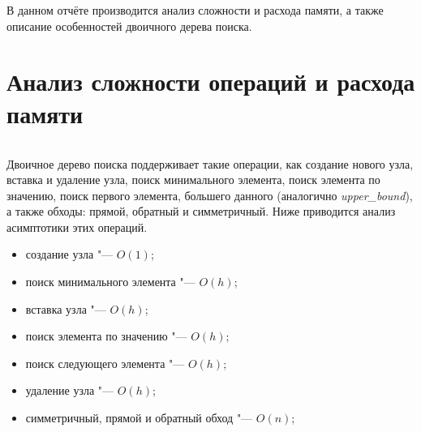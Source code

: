 \documentclass[otchet]{../SCWorks}
\begin{document}

\date{2026}

\maketitle

\secNumbering

\tableofcontents




\intro
В данном отчёте производится анализ сложности и расхода памяти, а также описание особенностей двоичного дерева поиска.

\section{Анализ сложности операций и расхода памяти}

\small
\inputminted[breaklines]{cpp}{./binary_tree.cpp}
\normalsize

Двоичное дерево поиска поддерживает такие операции, как создание нового узла, вставка и удаление узла, поиск минимального элемента, поиск элемента по значению, поиск первого элемента, большего данного (аналогично \textit{upper\_bound}), а также обходы: прямой, обратный и симметричный. Ниже приводится анализ асимптотики этих операций.

\begin{itemize}
	\item создание узла "--- $O(1)$;
	\item поиск минимального элемента "--- $O(h)$;
	\item вставка узла "--- $O(h)$;
	\item поиск элемента по значению "--- $O(h)$;
	\item поиск следующего элемента "--- $O(h)$;
	\item удаление узла "--- $O(h)$;
	\item симметричный, прямой и обратный обход "--- $O(n)$;
\end{itemize}
\end{document}
